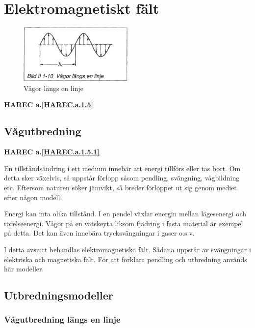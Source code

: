 \section{Elektromagnetiskt fält}

\begin{figure}
  \includegraphics[width=0.5\textwidth]{images/bild_2_1-10}
  \caption{Vågor längs en linje}
  \label{fig:BildII1-10}
\end{figure}

\textbf{HAREC a.\ref{HAREC.a.1.5}\label{myHAREC.a.1.5}}

\subsection{Vågutbredning}
\textbf{HAREC a.\ref{HAREC.a.1.5.1}\label{myHAREC.a.1.5.1}}

En tillståndsändring i ett medium innebär att energi tillförs eller tas bort.
Om detta sker växelvis, så uppstår förlopp såsom pendling, svängning,
vågbildning etc.
Eftersom naturen söker jämvikt, så breder förloppet ut sig genom mediet efter
någon modell.

Energi kan inta olika tillstånd. I en pendel växlar energin mellan lägesenergi
och rörelseenergi. Vågor på en vätskeyta liksom fjädring i fasta material är
exempel på detta. Det kan även innebära trycksvängningar i gaser o.s.v.

I detta avsnitt behandlas elektromagnetiska fält. Sådana uppstår av svängningar
i elektriska och magnetiska fält. För att förklara pendling och utbredning
används här modeller.

\subsection{Utbredningsmodeller}

\subsubsection{Vågutbredning längs en linje}

